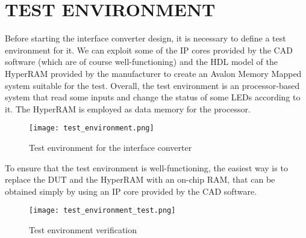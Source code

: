 \documentclass[10pt, english, a4paper, titlepage, oneside]{book}
\begin{document}
\chapter{TEST ENVIRONMENT}
\noindent Before starting the interface converter design, it is necessary to define a test environment for it. We can exploit some of the IP cores provided by the CAD software (which are of course well-functioning) and the HDL model of the HyperRAM provided by the manufacturer to create an Avalon Memory Mapped system suitable for the test. Overall, the test environment is an processor-based system that read some inputs and change the status of some LEDs according to it. The HyperRAM is employed as data memory for the processor.
\vspace{6mm}
\begin{figure}[H]
    \centering
    \texttt{[image: test\_environment.png]}
    \vspace{3mm}
    \caption{Test environment for the interface converter}
    \label{test_environment}
\end{figure}
\vspace{6mm}
\noindent To ensure that the test environment is well-functioning, the easiest way is to replace the DUT and the HyperRAM with an on-chip RAM, that can be obtained simply by using an IP core provided by the CAD software.
\vspace{6mm}
\begin{figure}[H]
    \centering
    \texttt{[image: test\_environment\_test.png]}
    \vspace{3mm}
    \caption{Test environment verification}
    \label{test_environment_test}
\end{figure}

\end{document}
